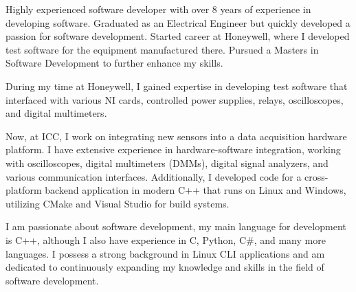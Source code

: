 

\begin{cvparagraph}

\begin{itemize}
\begin{item}
Highly experienced software developer with over 8 years of experience in developing software. Graduated as an Electrical Engineer but quickly developed a passion for software development. Started career at Honeywell, where I developed test software for the equipment manufactured there. Pursued a Masters in Software Development to further enhance my skills.
\end{item}
\begin{item}
During my time at Honeywell, I gained expertise in developing test software that interfaced with various NI cards, controlled power supplies, relays, oscilloscopes, and digital multimeters.
\end{item}
\begin{item}
Now, at ICC, I work on integrating new sensors into a data acquisition hardware platform. I have extensive experience in hardware-software integration, working with oscilloscopes, digital multimeters (DMMs), digital signal analyzers, and various communication interfaces. Additionally, I developed code for a cross-platform backend application in modern C++ that runs on Linux and Windows, utilizing CMake and Visual Studio for build systems.
\end{item}
\begin{item}
I am passionate about software development, my main language for development is C++, although I also have experience in C, Python, C\#, and many more languages. I possess a strong background in Linux CLI applications and am dedicated to continuously expanding my knowledge and skills in the field of software development.
\end{item}
\end{itemize}

\end{cvparagraph}
